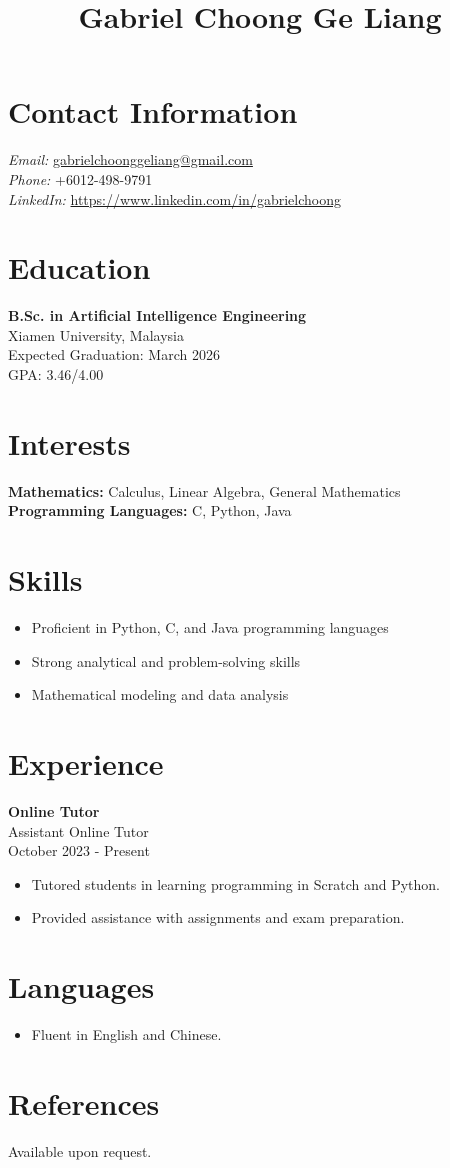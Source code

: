 \documentclass[a4paper,10pt]{article}
\title{Gabriel Choong Ge Liang}
\date{}  %
\renewcommand{\maketitle}{%
  \begin{center}
    \bfseries
    \Huge\thetitle\par
  \end{center}
}
\begin{document}
\maketitle  %

\section*{Contact Information}
\textit{Email:} \href{mailto:gabrielchoonggeliang@gmail.com}{gabrielchoonggeliang@gmail.com} \\
\textit{Phone:} +6012-498-9791 \\
\textit{LinkedIn:} \url{https://www.linkedin.com/in/gabrielchoong}

\section*{Education}
\textbf{B.Sc. in Artificial Intelligence Engineering} \\
Xiamen University, Malaysia \\
Expected Graduation: March 2026 \\
GPA: 3.46/4.00

\section*{Interests}
\textbf{Mathematics:} Calculus, Linear Algebra, General Mathematics \\
\textbf{Programming Languages:} C, Python, Java

\section*{Skills}
\begin{itemize}
    \item Proficient in Python, C, and Java programming languages
    \item Strong analytical and problem-solving skills
    \item Mathematical modeling and data analysis
\end{itemize}

\section*{Experience}
\textbf{Online Tutor} \\
Assistant Online Tutor \\
October 2023 - Present \\
\begin{itemize}
    \item Tutored students in learning programming in Scratch and Python.
    \item Provided assistance with assignments and exam preparation.
\end{itemize}

\section*{Languages}
\begin{itemize}
    \item Fluent in English and Chinese.
\end{itemize}

\section*{References}
Available upon request.
\end{document}
